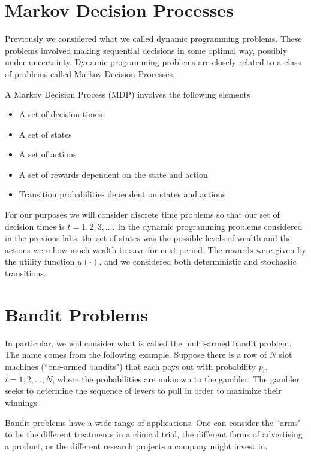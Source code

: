 
\section*{Markov Decision Processes}
Previously we considered what we called dynamic programming problems.  These problems involved making sequential decisions in some optimal way, possibly under uncertainty.  Dynamic programming problems are closely related to a class of problems called Markov Decision Processes.

A Markov Decision Process (MDP) involves the following elements

\begin{itemize}
\item   A set of decision times
\item   A set of states
\item   A set of actions
\item   A set of rewards dependent on the state and action
\item   Transition probabilities dependent on states and actions.
\end{itemize}

For our purposes we will consider discrete time problems so that our set of decision times is $t = 1,2,3,\ldots$.  In the dynamic programming problems considered in the previous labs, the set of states was the possible levels of wealth and the actions were how much wealth to save for next period.  The rewards were given by the utility function $u(\cdot)$, and we considered both deterministic and stochastic transitions.

\section*{Bandit Problems}
In particular, we will consider what is called the multi-armed bandit problem.  The name comes from the following example.  Suppose there is a row of $N$ slot machines (``one-armed bandits") that each pays out with probability $p_i$, $i= 1,2,\ldots,N$, where the probabilities are unknown to the gambler.  The gambler seeks to determine the sequence of levers to pull in order to maximize their winnings.

Bandit problems have a wide range of applications.  One can consider the ``arms" to be the different treatments in a clinical trial, the different forms of advertising a product, or the different research projects a company might invest in.

